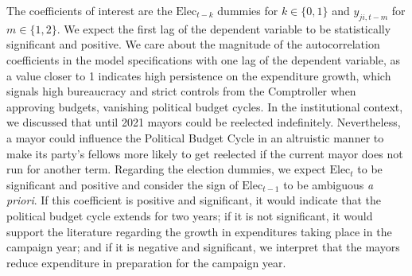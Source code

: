 
The coefficients of interest are the $\text{Elec}_{t-k}$ dummies for $k\in\{0, 1\}$ and $y_{ji,t-m}$ for $m\in\{1, 2\}$. We expect the first lag of the dependent variable to be statistically significant and positive. We care about the magnitude of the autocorrelation coefficients in the model specifications with one lag of the dependent variable, as a value closer to 1 indicates high persistence on the expenditure growth, which signals high bureaucracy and strict controls from the Comptroller when approving budgets, vanishing political budget cycles. In the institutional context, we discussed that until 2021 mayors could be reelected indefinitely. Nevertheless, a mayor could influence the Political Budget Cycle in an altruistic manner to make its party's fellows more likely to get reelected if the current mayor does not run for another term. Regarding the election dummies, we expect $\text{Elec}_t$ to be significant and positive and consider the sign of $\text{Elec}_{t-1}$ to be ambiguous \textit{a priori}. If this coefficient is positive and significant, it would indicate that the political budget cycle extends for two years; if it is not significant, it would support the literature regarding the growth in expenditures taking place in the campaign year; and if it is negative and significant, we interpret that the mayors reduce expenditure in preparation for the campaign year. 


